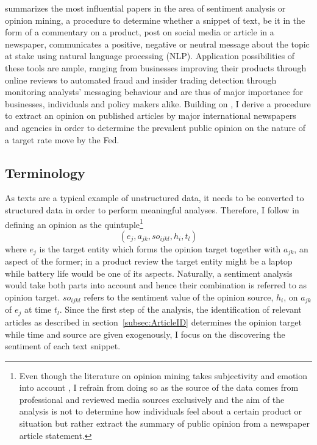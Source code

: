 
\textcite{Liu.2012} summarizes the most influential papers in the area of sentiment analysis or opinion mining, a procedure to determine whether a snippet of text, be it in the form of a commentary on a product, post on social media or article in a newspaper, communicates a positive, negative or neutral message about the topic at stake using natural language processing (NLP). Application possibilities of these tools are ample, ranging from businesses improving their products through online reviews to automated fraud and insider trading detection through monitoring analysts' messaging behaviour and are thus of major importance for businesses, individuals and policy makers alike. 
Building on \textcite{Liu.2012,Feldman.2013,Silge.2017,Friedman.2001}, %
I derive a procedure to extract an opinion on published articles by major international newspapers and agencies in order to determine the prevalent public opinion on the nature of a target rate move by the Fed.

\subsection{Terminology}

As texts are a typical example of unstructured data, it needs to be converted to structured data in order to perform meaningful analyses. Therefore, I follow \textcite{Liu.2010} in defining an opinion as the quintuple\footnote{Even though the literature on opinion mining takes subjectivity and emotion into account \parencite{Wiebe.2000,Wiebe.2004,Riloff.2006}, I refrain from doing so as the source of the data comes from professional and reviewed media sources exclusively and the aim of the analysis is not to determine how individuals feel about a certain product or situation but rather extract the summary of public opinion from a newspaper article statement.} 
\begin{equation}
	(e_j, a_{jk}, so_{ijkl}, h_i, t_l)
\end{equation}
where $e_j$ is the target entity which forms the opinion target together with $a_{jk}$, an aspect of the former; in a product review the target entity might be a laptop while battery life would be one of its aspects. Naturally, a sentiment analysis would take both parts into account and hence their combination is referred to as opinion target. $so_{ijkl}$ refers to the sentiment value of the opinion source, $h_i$, on $a_{jk}$ of $e_j$ at time $t_l$. 
Since the first step of the analysis, the identification of relevant articles as described in section~\ref{subsec:ArticleID} determines the opinion target while time and source are given exogenously, I focus on the discovering the sentiment of each text snippet. 



